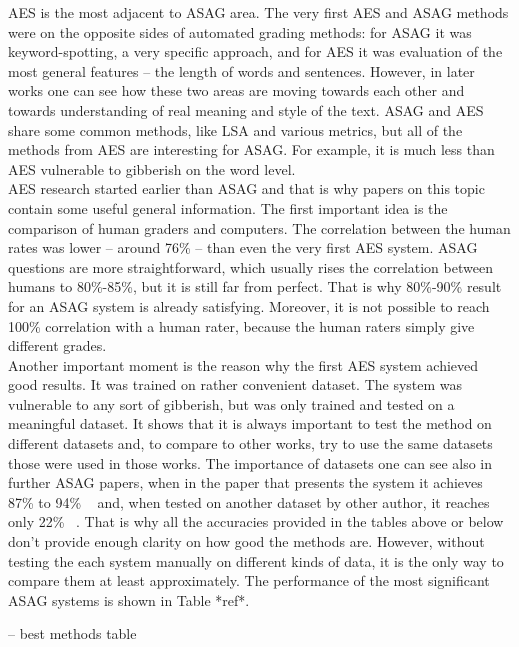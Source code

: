 \documentclass[11pt]{report}
\numberwithin{equation}{section} %
\begin{document}
AES is the most adjacent to ASAG area. The very first AES and ASAG methods were on the opposite sides of automated grading methods: for ASAG it was keyword-spotting, a very specific approach, and for AES it was evaluation of the most general features -- the length of words and sentences. However, in later works one can see how these two areas are moving towards each other and towards understanding of real meaning and style of the text. ASAG and AES share some common methods, like LSA and various metrics, but all of the methods from AES are interesting for ASAG. For example, it is much less than AES vulnerable to gibberish on the word level. \\

AES research started earlier than ASAG and that is why papers on this topic contain some useful general information. The first important idea is the comparison of human graders and computers. The correlation between the human rates was lower -- around 76\% -- than even the very first AES system. ASAG questions are more straightforward, which usually rises the correlation between humans to 80\%-85\%, but it is still far from perfect. That is why 80\%-90\% result for an ASAG system is already satisfying. Moreover, it is not possible to reach 100\% correlation with a human rater, because the human raters simply give different grades.\\

Another important moment is the reason why the first AES system achieved good results. It was trained on rather convenient dataset. The system was vulnerable to any sort of gibberish, but was only trained and tested on a meaningful dataset. It shows that it is always important to test the method on different datasets and, to compare to other works, try to use the same datasets those were used in those works. The importance of datasets one can see also in further ASAG papers, when in the paper that presents the system it achieves 87\% to 94\% ~\cite{c-rater} and, when tested on another dataset by other author, it reaches only 22\% ~\cite{Mohler}. That is why all the accuracies provided in the tables above or below don't provide enough clarity on how good the methods are. However, without testing the each system manually on different kinds of data, it is the only way to compare them at least approximately. The performance of the most significant ASAG systems is shown in Table *ref*.

-- best methods table
\end{document}
